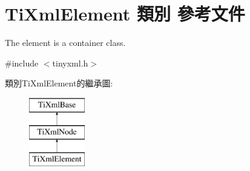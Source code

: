 \hypertarget{class_ti_xml_element}{}\section{Ti\+Xml\+Element 類別 參考文件}
\label{class_ti_xml_element}


The element is a container class.  




{\ttfamily \#include $<$tinyxml.\+h$>$}

類別\+Ti\+Xml\+Element的繼承圖\+:\begin{figure}[H]
\begin{center}
\leavevmode
\includegraphics[height=3.000000cm]{class_ti_xml_element}
\end{center}
\end{figure}

